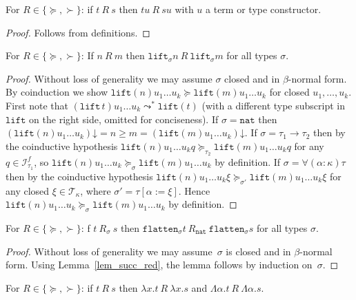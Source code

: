 \documentclass[a4paper,UKenglish,cleveref,autoref,numberwithinsect]{lipics-v2019}
\theoremstyle{definition}
\newcommand{\Iterms}{\mathcal{I}}
\newcommand{\arrtype}{\rightarrow}
\newcommand{\subst}[2]{#1:=#2}
\newcommand{\abs}[2]{\lambda #1.#2}
\newcommand{\tabs}[2]{\Lambda #1.#2}
\newcommand{\nat}{\mathtt{nat}}
\newcommand{\flatten}{\mathtt{flatten}}
\newcommand{\lift}{\mathtt{lift}}
\newcommand{\Tc}{\mathcal{T}}
\newcommand{\da}{\mathord{\downarrow}}
\begin{document}
\begin{lemma}\label{lem_app_succ}
  For $R \in \{\succeq,\succ\}$: if $t\:R\:s$ then $t u\:R\:s u$ with
  $u$ a term or type constructor.
\end{lemma}

\begin{proof}
  Follows from definitions.
\end{proof}

\begin{lemma}\label{lem:liftgreater}
  For $R \in \{\succeq,\succ\}$: If $n\:R\:m$ then
  $\lift_\sigma n\:R\:\lift_\sigma m$ for all types $\sigma$.
\end{lemma}

\begin{proof}
  Without loss of generality we may assume $\sigma$ closed and in
  $\beta$-normal form. By coinduction we show
  $\lift(n) u_1 \ldots u_k \succeq \lift(m) u_1 \ldots u_k$ for closed
  $u_1,\ldots,u_k$. First note that
  $(\lift\,t) u_1 \ldots u_k \leadsto^* \lift(t)$ (with a different
  type subscript in~$\lift$ on the right side, omitted for
  conciseness). If $\sigma = \nat$ then
  $(\lift(n) u_1 \ldots u_k)\da = n \ge m = (\lift(m) u_1 \ldots
  u_k)\da$. If $\sigma = \tau_1\arrtype\tau_2$ then by the coinductive
  hypothesis
  $\lift(n) u_1 \ldots u_k q \succeq_{\tau_2} \lift(m) u_1 \ldots u_k
  q$ for any $q \in \Iterms^f_{\tau_1}$, so
  $\lift(n) u_1 \ldots u_k \succeq_{\sigma} \lift(m) u_1 \ldots u_k$
  by definition. If $\sigma = \forall(\alpha:\kappa)\tau$ then by the
  coinductive hypothesis
  $\lift(n) u_1 \ldots u_k \xi \succeq_{\sigma'} \lift(m) u_1 \ldots
  u_k \xi$ for any closed $\xi \in \Tc_\kappa$, where
  $\sigma' = \tau[\subst{\alpha}{\xi}]$. Hence
  $\lift(n) u_1 \ldots u_k \succeq_{\sigma} \lift(m) u_1 \ldots u_k$
  by definition.
\end{proof}

\begin{lemma}\label{lem_flatten_succ}
  For $R \in \{\succeq,\succ\}$: f $t\:R_\sigma\:s$ then
  $\flatten_\sigma t\:R_\nat\: \flatten_\sigma s$ for all types
  $\sigma$.
\end{lemma}

\begin{proof}
  Without loss of generality we may assume~$\sigma$ is closed and in
  $\beta$-normal form. Using Lemma~\ref{lem_succ_red}, the lemma
  follows by induction on~$\sigma$.
\end{proof}

\begin{lemma}\label{lem_abs_succ}
  For $R \in \{\succeq,\succ\}$: if $t\:R\:s$ then
  $\abs{x}{t}\:R\:\abs{x}{s}$ and
  $\tabs{\alpha}{t}\:R\:\tabs{\alpha}{s}$.
\end{lemma}
\end{document}
